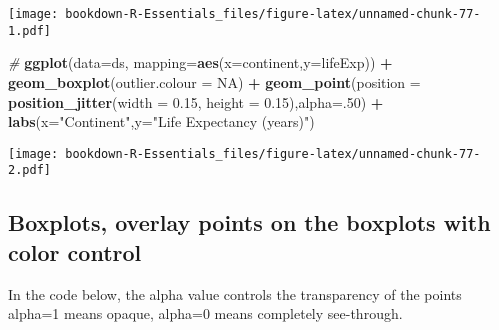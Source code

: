 \documentclass[]{book}
\newenvironment{Shaded}{\begin{snugshade}}{\end{snugshade}}
\newcommand{\KeywordTok}[1]{\textcolor[rgb]{0.13,0.29,0.53}{\textbf{#1}}}
\newcommand{\DataTypeTok}[1]{\textcolor[rgb]{0.13,0.29,0.53}{#1}}
\newcommand{\DecValTok}[1]{\textcolor[rgb]{0.00,0.00,0.81}{#1}}
\newcommand{\FloatTok}[1]{\textcolor[rgb]{0.00,0.00,0.81}{#1}}
\newcommand{\StringTok}[1]{\textcolor[rgb]{0.31,0.60,0.02}{#1}}
\newcommand{\CommentTok}[1]{\textcolor[rgb]{0.56,0.35,0.01}{\textit{#1}}}
\newcommand{\OtherTok}[1]{\textcolor[rgb]{0.56,0.35,0.01}{#1}}
\newcommand{\OperatorTok}[1]{\textcolor[rgb]{0.81,0.36,0.00}{\textbf{#1}}}
\newcommand{\NormalTok}[1]{#1}
\begin{document}
\texttt{[image: bookdown-R-Essentials\_files/figure-latex/unnamed-chunk-77-1.pdf]}

\begin{Shaded}
\begin{Highlighting}[]
\CommentTok{#}
\KeywordTok{ggplot}\NormalTok{(}\DataTypeTok{data=}\NormalTok{ds, }\DataTypeTok{mapping=}\KeywordTok{aes}\NormalTok{(}\DataTypeTok{x=}\NormalTok{continent,}\DataTypeTok{y=}\NormalTok{lifeExp)) }\OperatorTok{+}\StringTok{  }
\StringTok{ }\KeywordTok{geom_boxplot}\NormalTok{(}\DataTypeTok{outlier.colour =} \OtherTok{NA}\NormalTok{) }\OperatorTok{+}\StringTok{ }
\StringTok{ }\KeywordTok{geom_point}\NormalTok{(}\DataTypeTok{position =} \KeywordTok{position_jitter}\NormalTok{(}\DataTypeTok{width =} \FloatTok{0.15}\NormalTok{, }\DataTypeTok{height =} \FloatTok{0.15}\NormalTok{),}\DataTypeTok{alpha=}\NormalTok{.}\DecValTok{50}\NormalTok{) }\OperatorTok{+}
\StringTok{  }\KeywordTok{labs}\NormalTok{(}\DataTypeTok{x=}\StringTok{"Continent"}\NormalTok{,}\DataTypeTok{y=}\StringTok{"Life Expectancy (years)"}\NormalTok{)}
\end{Highlighting}
\end{Shaded}

\texttt{[image: bookdown-R-Essentials\_files/figure-latex/unnamed-chunk-77-2.pdf]}

\subsection{Boxplots, overlay points on the boxplots with color
control}\label{boxplots-overlay-points-on-the-boxplots-with-color-control}

In the code below, the alpha value controls the transparency of the
points alpha=1 means opaque, alpha=0 means completely see-through.
\end{document}
